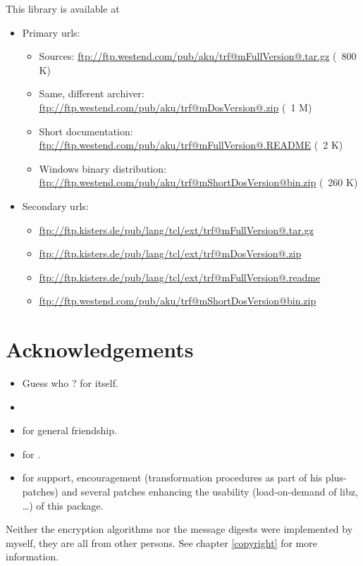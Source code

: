 \documentclass {report}
\begin{document}
This library is available at
\begin {itemize}
\item[] Primary urls:
\begin {itemize}
\item[Sources:] \url {ftp://ftp.westend.com/pub/aku/trf@mFullVersion@.tar.gz} (~800 K)
\item[Same, different archiver:] \url {ftp://ftp.westend.com/pub/aku/trf@mDosVersion@.zip} (~1 M)
\item[Short documentation:] \url {ftp://ftp.westend.com/pub/aku/trf@mFullVersion@.README} (~2 K)
\item[Windows binary distribution:] \url {ftp://ftp.westend.com/pub/aku/trf@mShortDosVersion@bin.zip} (~260 K)
\end {itemize}

\item[] Secondary urls:
\begin {itemize}
\item \url {ftp://ftp.kisters.de/pub/lang/tcl/ext/trf@mFullVersion@.tar.gz}
\item \url {ftp://ftp.kisters.de/pub/lang/tcl/ext/trf@mDosVersion@.zip}
\item \url {ftp://ftp.kisters.de/pub/lang/tcl/ext/trf@mFullVersion@.readme}
\item \url {ftp://ftp.westend.com/pub/aku/trf@mShortDosVersion@bin.zip}
\end {itemize}
\end {itemize}


\chapter {Acknowledgements}

\begin {itemize}\Large
\item	Guess who ? \jo{} for \tcl {} itself. 
\item	\jyl
\item	\bast{} for general friendship.
\item	\greyham{} for .
\item	\jan{} for support, encouragement
	(transformation procedures as part of his plus-patches) and
	several patches enhancing the usability (load-on-demand of
	libz, \dots{}) of this package.
\end   {itemize}

Neither the encryption algorithms nor the message digests were
implemented by myself, they are all from other persons. See chapter
\ref {copyright} for more information.
\end{document}
